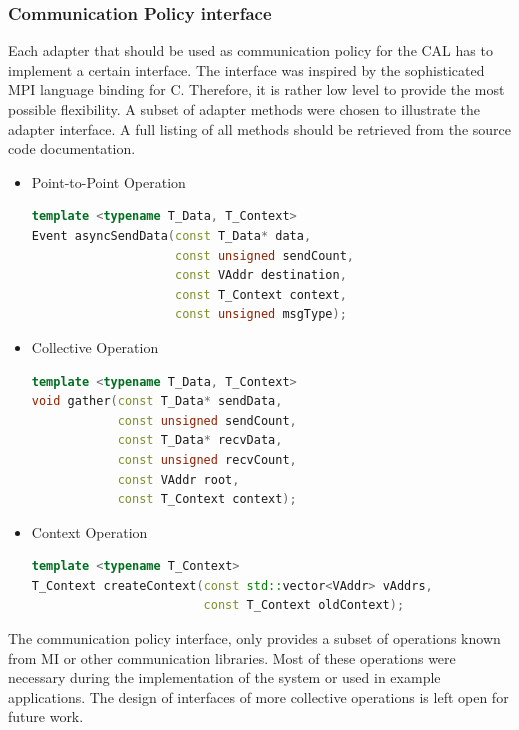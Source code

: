 \subsubsection{Communication Policy interface}
\label{sec:impl:policy_interface}
Each adapter that should be used as communication policy for the CAL
has to implement a certain interface.  The interface was inspired by
the sophisticated MPI language binding for C. Therefore, it is rather
low level to provide the most possible flexibility.  A subset of
adapter methods were chosen to illustrate the adapter interface. A full
listing of all methods should be retrieved from the source code
documentation.

\begin{itemize}

  \item Point-to-Point Operation
    \begin{lstlisting}[language=C++, breaklines=false, label={}]
template <typename T_Data, T_Context>      
Event asyncSendData(const T_Data* data,
                    const unsigned sendCount,
                    const VAddr destination,
                    const T_Context context,
                    const unsigned msgType);
    \end{lstlisting}
    
  \item Collective Operation
    \begin{lstlisting}[language=C++, breaklines=false, label={}]
template <typename T_Data, T_Context>      
void gather(const T_Data* sendData,
            const unsigned sendCount,
            const T_Data* recvData,
            const unsigned recvCount,
            const VAddr root,
            const T_Context context);
    \end{lstlisting}

  \item Context Operation
    \begin{lstlisting}[language=C++, breaklines=false, label={}]
template <typename T_Context>      
T_Context createContext(const std::vector<VAddr> vAddrs,
                        const T_Context oldContext);
    \end{lstlisting}
  
\end{itemize}

\noindent The communication policy interface, only provides a subset
of operations known from MI or other communication libraries.  Most
of these operations were necessary during the implementation of the
system or used in example applications. The design of interfaces of
more collective operations is left open for future work.


